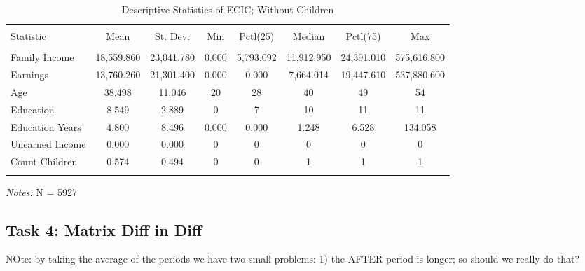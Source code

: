 \documentclass[a4paper]{article}
\begin{document}
\begin{table}[!htbp] 
\begin{adjustwidth}{-0cm}{-0cm}
\begin{threeparttable}
\small
\captionsetup{font=small, justification=raggedright,singlelinecheck=false}
  \caption{Descriptive Statistics of ECIC; Without Children} 
  \label{} 
\begin{tabular}{@{\extracolsep{5pt}}lccccccc} 
\\[-1.8ex]\hline 
\hline \\[-1.8ex] 
Statistic & \multicolumn{1}{c}{Mean} & \multicolumn{1}{c}{St. Dev.} & \multicolumn{1}{c}{Min} & \multicolumn{1}{c}{Pctl(25)} & \multicolumn{1}{c}{Median} & \multicolumn{1}{c}{Pctl(75)} & \multicolumn{1}{c}{Max} \\ 
\hline \\[-1.8ex] 
Family Income & 18,559.860 & 23,041.780 & 0.000 & 5,793.092 & 11,912.950 & 24,391.010 & 575,616.800 \\ 
Earnings & 13,760.260 & 21,301.400 & 0.000 & 0.000 & 7,664.014 & 19,447.610 & 537,880.600 \\ 
Age & 38.498 & 11.046 & 20 & 28 & 40 & 49 & 54 \\ 
Education & 8.549 & 2.889 & 0 & 7 & 10 & 11 & 11 \\ 
Education Years & 4.800 & 8.496 & 0.000 & 0.000 & 1.248 & 6.528 & 134.058 \\ 
Unearned Income & 0.000 & 0.000 & 0 & 0 & 0 & 0 & 0 \\ 
Count Children & 0.574 & 0.494 & 0 & 0 & 1 & 1 & 1 \\ 
\hline \\[-1.8ex] 
\end{tabular} 
\begin{tablenotes}
      \small
      \item\textit{Notes:} N = 5927
    \end{tablenotes}
\end{threeparttable}
\end{adjustwidth}
\end{table}


\subsection{Task 4: Matrix Diff in Diff}
NOte: by taking the average of the periods we have two small problems: 1) the AFTER period is longer; so should we really do that?
\end{document}
